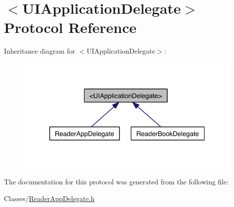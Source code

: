 \hypertarget{class_u_i_application_delegate-p}{\section{$<$U\-I\-Application\-Delegate$>$ Protocol Reference}
\label{d8/d72/class_u_i_application_delegate-p}
}


Inheritance diagram for $<$U\-I\-Application\-Delegate$>$\-:
\nopagebreak
\begin{figure}[H]
\begin{center}
\leavevmode
\includegraphics[width=315pt]{dd/de9/class_u_i_application_delegate-p__inherit__graph}
\end{center}
\end{figure}


The documentation for this protocol was generated from the following file\-:\begin{DoxyCompactItemize}
\item 
Classes/\hyperlink{_reader_app_delegate_8h}{Reader\-App\-Delegate.\-h}\end{DoxyCompactItemize}
